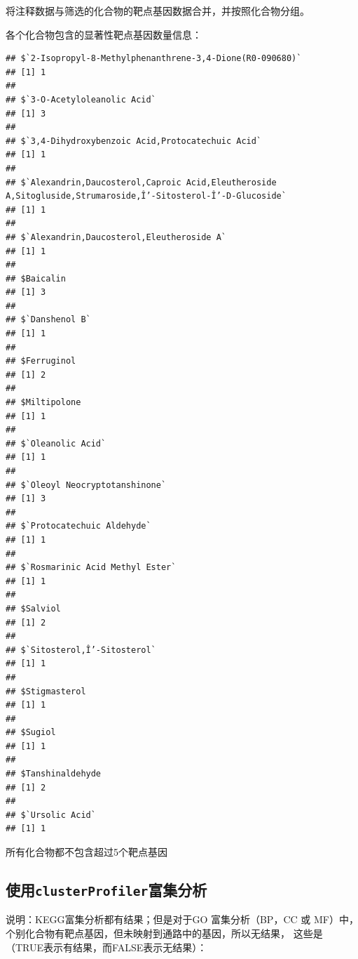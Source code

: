 \documentclass[
]{article}
\begin{document}
将注释数据与筛选的化合物的靶点基因数据合并，并按照化合物分组。

各个化合物包含的显著性靶点基因数量信息：

\begin{verbatim}
## $`2-Isopropyl-8-Methylphenanthrene-3,4-Dione(R0-090680)`
## [1] 1
## 
## $`3-O-Acetyloleanolic Acid`
## [1] 3
## 
## $`3,4-Dihydroxybenzoic Acid,Protocatechuic Acid`
## [1] 1
## 
## $`Alexandrin,Daucosterol,Caproic Acid,Eleutheroside A,Sitogluside,Strumaroside,Î’-Sitosterol-Î’-D-Glucoside`
## [1] 1
## 
## $`Alexandrin,Daucosterol,Eleutheroside A`
## [1] 1
## 
## $Baicalin
## [1] 3
## 
## $`Danshenol B`
## [1] 1
## 
## $Ferruginol
## [1] 2
## 
## $Miltipolone
## [1] 1
## 
## $`Oleanolic Acid`
## [1] 1
## 
## $`Oleoyl Neocryptotanshinone`
## [1] 3
## 
## $`Protocatechuic Aldehyde`
## [1] 1
## 
## $`Rosmarinic Acid Methyl Ester`
## [1] 1
## 
## $Salviol
## [1] 2
## 
## $`Sitosterol,Î’-Sitosterol`
## [1] 1
## 
## $Stigmasterol
## [1] 1
## 
## $Sugiol
## [1] 1
## 
## $Tanshinaldehyde
## [1] 2
## 
## $`Ursolic Acid`
## [1] 1
\end{verbatim}

所有化合物都不包含超过5个靶点基因

\hypertarget{ux4f7fux7528clusterprofilerux5bccux96c6ux5206ux6790}{%
\subsection{\texorpdfstring{使用\texttt{clusterProfiler}富集分析}{使用clusterProfiler富集分析}}\label{ux4f7fux7528clusterprofilerux5bccux96c6ux5206ux6790}}

说明：KEGG富集分析都有结果；但是对于GO 富集分析（BP，CC 或 MF）中，个别化合物有靶点基因，但未映射到通路中的基因，所以无结果， 这些是（TRUE表示有结果，而FALSE表示无结果）：
\end{document}
